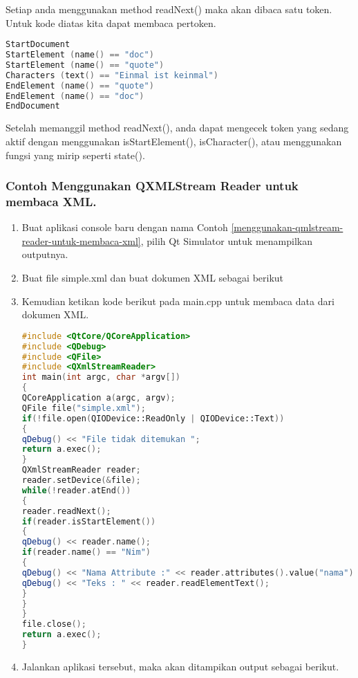 Setiap anda menggunakan method readNext() maka akan dibaca satu token.
Untuk kode diatas kita dapat membaca pertoken.

\begin{lstlisting}[language=c++, numbers=none]
StartDocument
StartElement (name() == "doc")
StartElement (name() == "quote")
Characters (text() == "Einmal ist keinmal")
EndElement (name() == "quote")
EndElement (name() == "doc")
EndDocument
\end{lstlisting}

Setelah memanggil method readNext(), anda dapat mengecek token yang
sedang aktif dengan menggunakan isStartElement(), isCharacter(), atau
menggunakan fungsi yang mirip seperti state().

\subsubsection*{Contoh  Menggunakan QXMLStream Reader untuk membaca XML.}

\begin{enumerate}


\item
  Buat aplikasi console baru dengan nama Contoh \ref{menggunakan-qmlstream-reader-untuk-membaca-xml}, pilih Qt Simulator
  untuk menampilkan outputnya.
\item
  Buat file simple.xml dan buat dokumen XML sebagai berikut
\end{enumerate}



\begin{enumerate}

\setcounter{enumi}{2}
\item
  Kemudian ketikan kode berikut pada main.cpp untuk membaca data dari
  dokumen XML.

\begin{lstlisting}[language=c++, caption=Menggunakan QXMLStream Reader untuk membaca XML, label=menggunakan-qmlstream-reader-untuk-membaca-xml]
#include <QtCore/QCoreApplication>
#include <QDebug>
#include <QFile>
#include <QXmlStreamReader>
int main(int argc, char *argv[])
{
QCoreApplication a(argc, argv);
QFile file("simple.xml");
if(!file.open(QIODevice::ReadOnly | QIODevice::Text))
{
qDebug() << "File tidak ditemukan ";
return a.exec();
}
QXmlStreamReader reader;
reader.setDevice(&file);
while(!reader.atEnd())
{
reader.readNext();
if(reader.isStartElement())
{
qDebug() << reader.name();
if(reader.name() == "Nim")
{
qDebug() << "Nama Attribute :" << reader.attributes().value("nama");
qDebug() << "Teks : " << reader.readElementText();
}
}
}
file.close();
return a.exec();
}
\end{lstlisting}
\item
  Jalankan aplikasi tersebut, maka akan ditampikan output sebagai
  berikut.
\end{enumerate}

